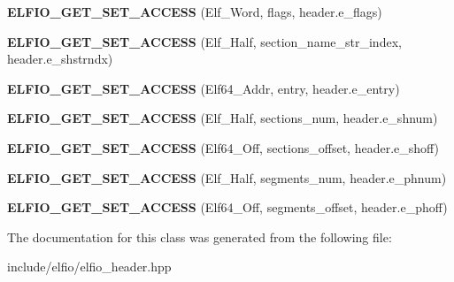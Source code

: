 \begin{DoxyCompactItemize}
\item 
{\bfseries E\+L\+F\+I\+O\+\_\+\+G\+E\+T\+\_\+\+S\+E\+T\+\_\+\+A\+C\+C\+E\+SS} (Elf\+\_\+\+Word, flags, header.\+e\+\_\+flags)\hypertarget{class_e_l_f_i_o_1_1elf__header__impl_ae29a839a52a29c630e7dd6739796acde}{}\label{class_e_l_f_i_o_1_1elf__header__impl_ae29a839a52a29c630e7dd6739796acde}

\item 
{\bfseries E\+L\+F\+I\+O\+\_\+\+G\+E\+T\+\_\+\+S\+E\+T\+\_\+\+A\+C\+C\+E\+SS} (Elf\+\_\+\+Half, section\+\_\+name\+\_\+str\+\_\+index, header.\+e\+\_\+shstrndx)\hypertarget{class_e_l_f_i_o_1_1elf__header__impl_a799c1da8737df93af47a17eae3e06f2a}{}\label{class_e_l_f_i_o_1_1elf__header__impl_a799c1da8737df93af47a17eae3e06f2a}

\item 
{\bfseries E\+L\+F\+I\+O\+\_\+\+G\+E\+T\+\_\+\+S\+E\+T\+\_\+\+A\+C\+C\+E\+SS} (Elf64\+\_\+\+Addr, entry, header.\+e\+\_\+entry)\hypertarget{class_e_l_f_i_o_1_1elf__header__impl_ad9d2bface2469e6ad79bed1b7347b7d3}{}\label{class_e_l_f_i_o_1_1elf__header__impl_ad9d2bface2469e6ad79bed1b7347b7d3}

\item 
{\bfseries E\+L\+F\+I\+O\+\_\+\+G\+E\+T\+\_\+\+S\+E\+T\+\_\+\+A\+C\+C\+E\+SS} (Elf\+\_\+\+Half, sections\+\_\+num, header.\+e\+\_\+shnum)\hypertarget{class_e_l_f_i_o_1_1elf__header__impl_ac58fc37a8cee60af02dd2a7f18dea170}{}\label{class_e_l_f_i_o_1_1elf__header__impl_ac58fc37a8cee60af02dd2a7f18dea170}

\item 
{\bfseries E\+L\+F\+I\+O\+\_\+\+G\+E\+T\+\_\+\+S\+E\+T\+\_\+\+A\+C\+C\+E\+SS} (Elf64\+\_\+\+Off, sections\+\_\+offset, header.\+e\+\_\+shoff)\hypertarget{class_e_l_f_i_o_1_1elf__header__impl_af7b4de848c45269f7a4405b7158ba67a}{}\label{class_e_l_f_i_o_1_1elf__header__impl_af7b4de848c45269f7a4405b7158ba67a}

\item 
{\bfseries E\+L\+F\+I\+O\+\_\+\+G\+E\+T\+\_\+\+S\+E\+T\+\_\+\+A\+C\+C\+E\+SS} (Elf\+\_\+\+Half, segments\+\_\+num, header.\+e\+\_\+phnum)\hypertarget{class_e_l_f_i_o_1_1elf__header__impl_ac83e843ac1c5493235b990a50b7373bb}{}\label{class_e_l_f_i_o_1_1elf__header__impl_ac83e843ac1c5493235b990a50b7373bb}

\item 
{\bfseries E\+L\+F\+I\+O\+\_\+\+G\+E\+T\+\_\+\+S\+E\+T\+\_\+\+A\+C\+C\+E\+SS} (Elf64\+\_\+\+Off, segments\+\_\+offset, header.\+e\+\_\+phoff)\hypertarget{class_e_l_f_i_o_1_1elf__header__impl_a7a0c56190c9f5f9b32afa52d15ea1c94}{}\label{class_e_l_f_i_o_1_1elf__header__impl_a7a0c56190c9f5f9b32afa52d15ea1c94}

\end{DoxyCompactItemize}


The documentation for this class was generated from the following file\+:\begin{DoxyCompactItemize}
\item 
include/elfio/elfio\+\_\+header.\+hpp\end{DoxyCompactItemize}
